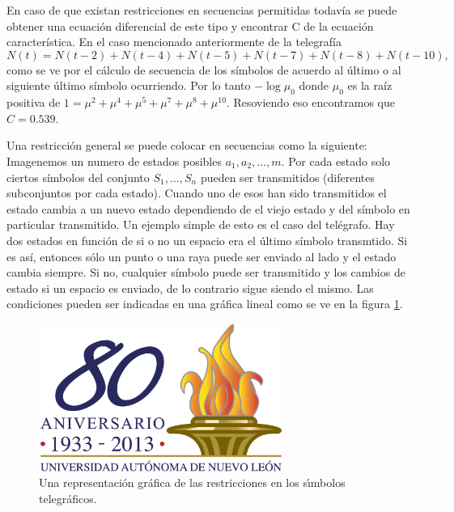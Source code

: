En caso de que existan restricciones en secuencias permitidas
todav\'ia se puede obtener una ecuaci\'on diferencial de este tipo y
encontrar C de la ecuaci\'on caracter\'istica. En el caso mencionado
anteriormente de la telegraf\'ia
\begin{equation}
N(t) = N(t-2)+N(t-4)+N(t-5)+N(t-7)+N(t-8)+N(t-10),
\end{equation}
como se ve por el c\'alculo de secuencia de los s\'imbolos de acuerdo
al \'ultimo o al siguiente \'ultimo s\'imbolo ocurriendo.  Por lo
tanto $-\log\mu_{0}$ donde $\mu_{0}$ es la ra\'iz positiva de $1
= \mu^{2}+\mu^{4}+\mu^{5}+\mu^{7}+\mu^{8}+\mu^{10}$. Resoviendo eso
encontramos que $C = 0.539$.

Una restricci\'on general se puede colocar en secuencias como la
siguiente: Imagenemos un numero de estados posibles $a_{1},
a_{2},\ldots,{m}$. Por cada estado solo ciertos s\'imbolos del
conjunto $S_{1},\ldots,S_{n}$ pueden ser transmitidos (diferentes
subconjuntos por cada estado). Cuando uno de esos han sido
transmitidos el estado cambia a un nuevo estado dependiendo de el
viejo estado y del s\'imbolo en particular transmitido. Un ejemplo
simple de esto es el caso del tel\'egrafo. Hay dos estados en
funci\'on de si o no un espacio era el \'ultimo s\'imbolo transmtido.
Si es as\'i, entonces s\'olo un punto o una raya puede ser enviado al
lado y el estado cambia siempre. Si no, cualquier s\'imbolo puede ser
transmitido y los cambios de estado si un espacio es enviado, de lo
contrario sigue siendo el mismo.  Las condiciones pueden ser indicadas
en una gr\'afica lineal como se ve en la figura \ref{fig:2}. 

\begin{figure}[!ht]
\centerline{\includegraphics[width=80mm]{ejemplo.png}}
\caption{Una representaci\'{o}n gr\'{a}fica de las restricciones 
en los s\'{\i}mbolos telegr\'{a}ficos.}
\label{fig:2}
\end{figure}


